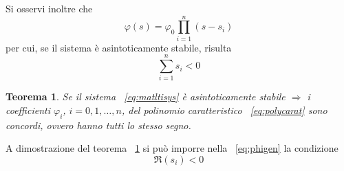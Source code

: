 \documentclass[a4paper]{report}
\begin{document}
Si osservi inoltre che
\begin{equation}\label{eq:phigen}
  \varphi(s)=\varphi_0 \prod_{i=1}^{n}(s-s_i)
\end{equation}
per cui, se il sistema \`e asintoticamente stabile,
risulta $$\sum_{i=1}^n s_i < 0$$

\newtheorem{Th5}{Teorema}[section]
\begin{Th5}\label{th:th5}
  Se il sistema ~\ref{eq:matltisys} \`e asintoticamente stabile
  $\Rightarrow$ i coefficienti $\varphi_i$, $i=0,1,\ldots,n$, del
  polinomio caratteristico ~\ref{eq:polycarat} sono concordi, ovvero
  hanno tutti lo stesso segno.
\end{Th5}
A dimostrazione del teorema ~\ref{th:th5} si pu\`o imporre nella
~\ref{eq:phigen} la condizione
\begin{displaymath}
  \Re (s_i) < 0
\end{displaymath}
\end{document}
